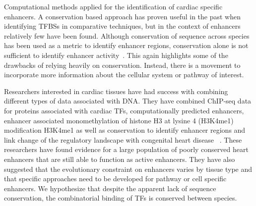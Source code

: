 Computational methods applied for the identification of cardiac specific enhancers. A conservation based approach has proven useful in the past when identifying TFBSs in comparative techniques, but in the context of enhancers relatively few have been found. Although conservation of sequence across species has been used as a metric to identify enhancer regions, conservation alone is not sufficient to identify enhancer activity~\cite{blow2010chip}. This again highlights some of the drawbacks of relying heavily on conservation. Instead, there is a movement to incorporate more information about the cellular system or pathway of interest. 
 
Researchers interested in cardiac tissues have had success with combining different types of data associated with DNA. They have combined ChIP-seq data for proteins associated with cardiac TFs, computationally predicted enhancers, enhancer associated monomethylation of histone H3 at lysine 4 (H3K4me1) modification H3K4me1 as well as conservation to identify enhancer regions and link change of the regulatory landscape with congenital heart disease ~\cite{smemo2012regulatory}. These researchers have found evidence for a large population of poorly conserved heart enhancers that are still able to function as active enhancers. They have also suggested that the evolutionary constraint on enhancers varies by tissue type and that specific approaches need to be developed for pathway or cell specific enhancers. We hypothesize that despite the apparent lack of sequence conservation, the combinatorial binding of TFs is conserved between species. 


       


   
